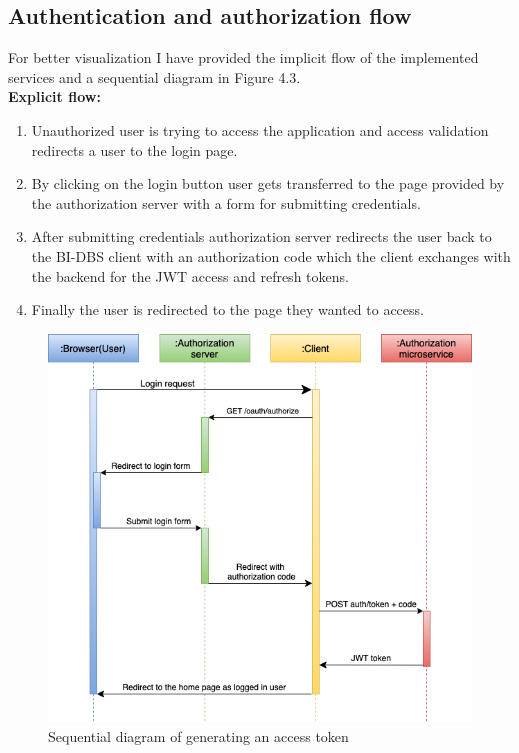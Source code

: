 \subsection{Authentication and authorization flow} For better visualization I have provided the implicit flow of the implemented services and a sequential diagram in Figure 4.3.\\

\noindent \textbf{Explicit flow:}

\begin{enumerate}
    \item Unauthorized user is trying to access the application and access validation redirects a user to the login page.
    \item By clicking on the login button user gets transferred to the page provided by the authorization server with a form for submitting credentials.
    \item After submitting credentials authorization server redirects the user back to the BI-DBS client with an authorization code which the client exchanges with the backend for the JWT access and refresh tokens.
    \item Finally the user is redirected to the page they wanted to access.
\end{enumerate}

\begin{figure}[hp]
\centering
\includegraphics[scale=0.56]{../png/generate_token.png}
\caption{Sequential diagram of generating an access token}
\end{figure}



